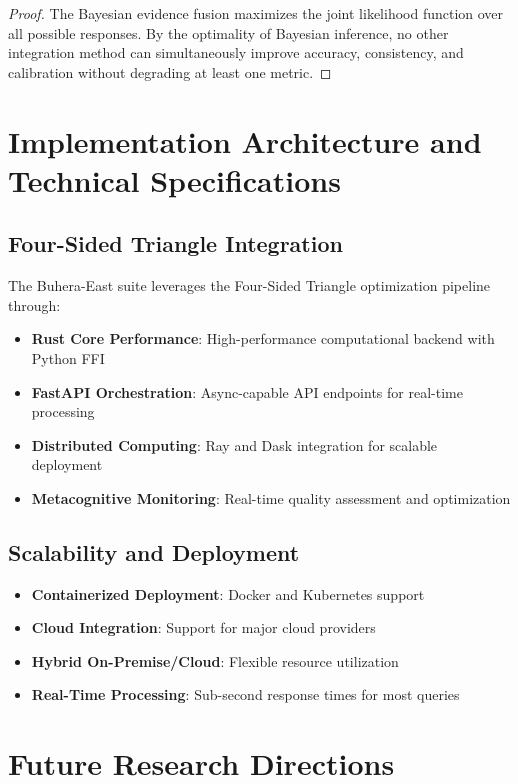 \documentclass[12pt,a4paper]{article}
\begin{document}
\begin{proof}
The Bayesian evidence fusion maximizes the joint likelihood function over all possible responses. By the optimality of Bayesian inference, no other integration method can simultaneously improve accuracy, consistency, and calibration without degrading at least one metric.
\end{proof}

\section{Implementation Architecture and Technical Specifications}

\subsection{Four-Sided Triangle Integration}

The Buhera-East suite leverages the Four-Sided Triangle optimization pipeline through:

\begin{itemize}
\item \textbf{Rust Core Performance}: High-performance computational backend with Python FFI
\item \textbf{FastAPI Orchestration}: Async-capable API endpoints for real-time processing
\item \textbf{Distributed Computing}: Ray and Dask integration for scalable deployment
\item \textbf{Metacognitive Monitoring}: Real-time quality assessment and optimization
\end{itemize}

\subsection{Scalability and Deployment}

\begin{itemize}
\item \textbf{Containerized Deployment}: Docker and Kubernetes support
\item \textbf{Cloud Integration}: Support for major cloud providers
\item \textbf{Hybrid On-Premise/Cloud}: Flexible resource utilization
\item \textbf{Real-Time Processing}: Sub-second response times for most queries
\end{itemize}

\section{Future Research Directions}
\end{document}
